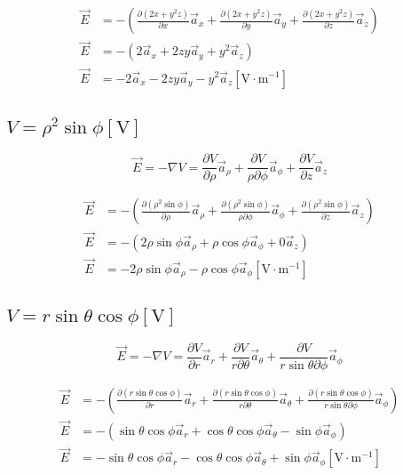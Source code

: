 \documentclass[14pt]{extarticle}
\begin{document}
\[
	\begin{aligned}
		\vec{E} & =-\left(\frac{\partial (2x+y^2z)}{\partial x}\vec{a}_x+\frac{\partial (2x+y^2z)}{\partial y}\vec{a}_y+\frac{\partial (2x+y^2z)}{\partial z}\vec{a}_z\right) \\
		\vec{E} & =-\left(2\vec{a}_x+2zy\vec{a}_y+y^2\vec{a}_z\right)                                                                                                         \\
		\vec{E} & =-2\vec{a}_x-2zy\vec{a}_y-y^2\vec{a}_z\left[\mathrm{V\cdot m^{-1}}\right]
	\end{aligned}
\]

\boldmath
\subsection{$V=\rho^2\sin{\phi}[\mathrm{V}]$}
\unboldmath

$$\vec{E}=-\nabla V=\frac{\partial V}{\partial \rho}\vec{a}_\rho+\frac{\partial V}{\rho\partial \phi}\vec{a}_\phi+\frac{\partial V}{\partial z}\vec{a}_z$$

\[
	\begin{aligned}
		\vec{E} & =-\left(\frac{\partial (\rho^2\sin{\phi})}{\partial \rho}\vec{a}_\rho+\frac{\partial (\rho^2\sin{\phi})}{\rho\partial \phi}\vec{a}_\phi+\frac{\partial (\rho^2\sin{\phi})}{\partial z}\vec{a}_z\right) \\
		\vec{E} & =-\left(2\rho\sin{\phi}\vec{a}_\rho+\rho\cos{\phi}\vec{a}_\phi+0\vec{a}_z\right)                                                                                                                       \\
		\vec{E} & =-2\rho\sin{\phi}\vec{a}_\rho-\rho\cos{\phi}\vec{a}_\phi\left[\mathrm{V\cdot m^{-1}}\right]
	\end{aligned}
\]

\boldmath
\subsection{$V=r\sin{\theta}\cos{\phi}[\mathrm{V}]$}
\unboldmath

$$\vec{E}=-\nabla V=\frac{\partial V}{\partial r}\vec{a}_r+\frac{\partial V}{r\partial \theta}\vec{a}_\theta+\frac{\partial V}{r\sin{\theta}\partial \phi}\vec{a}_\phi$$

\[
	\begin{aligned}
		\vec{E} & =-\left(\frac{\partial (r\sin{\theta}\cos{\phi})}{\partial r}\vec{a}_r+\frac{\partial (r\sin{\theta}\cos{\phi})}{r\partial \theta}\vec{a}_\theta+\frac{\partial (r\sin{\theta}\cos{\phi})}{r\sin{\theta}\partial \phi}\vec{a}_\phi\right) \\
		\vec{E} & =-\left(\sin{\theta}\cos{\phi}\vec{a}_r+\cos{\theta}\cos{\phi}\vec{a}_\theta-\sin{\phi}\vec{a}_\phi\right)                                                                                                                                \\
		\vec{E} & =-\sin{\theta}\cos{\phi}\vec{a}_r-\cos{\theta}\cos{\phi}\vec{a}_\theta+\sin{\phi}\vec{a}_\phi\left[\mathrm{V\cdot m^{-1}}\right]
	\end{aligned}
\]
\end{document}
